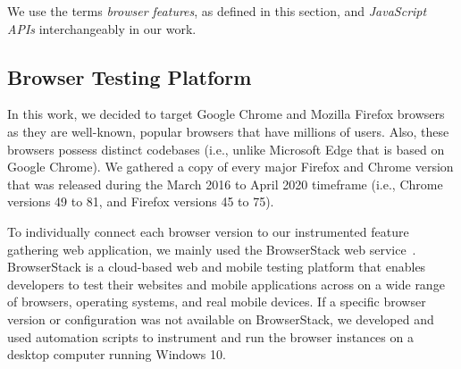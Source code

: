 We use the terms \textit{browser features}, as defined in this section,
and \textit{JavaScript APIs} interchangeably in our work.




\subsection{Browser Testing Platform}

In this work, we decided to target Google Chrome and Mozilla
Firefox browsers as they are well-known, popular browsers that have
millions of users. Also, these browsers possess distinct codebases
(i.e., unlike Microsoft Edge that is based on Google Chrome). We
gathered a copy of every major Firefox and Chrome version that was
released during the March 2016 to April 2020 timeframe (i.e., Chrome
versions 49 to 81, and Firefox versions 45 to 75).

To individually connect each browser version to our instrumented
feature gathering web application, we mainly used the BrowserStack web
service~\cite{browserstack}. BrowserStack is a cloud-based web and mobile testing platform
that enables developers to test their websites and mobile applications
across on a wide range of browsers, operating systems, and real mobile
devices. If a specific browser version or configuration was not
available on BrowserStack, we developed and used automation scripts to
instrument and run the browser instances on a desktop computer running
Windows 10.



